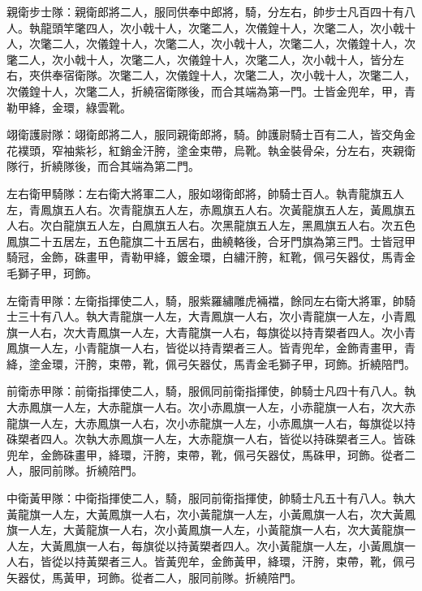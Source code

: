 \begin{pinyinscope}
 親衛步士隊：親衛郎將二人，服同供奉中郎將，騎，分左右，帥步士凡百四十有八人。執龍頭竿氅四人，次小戟十人，次氅二人，次儀鍠十人，次氅二人，次小戟十人，次氅二人，次儀鍠十人，次氅二人，次小戟十人，次氅二人，次儀鍠十人，次氅二人，次小戟十人，次氅二人，次儀鍠十人，次氅二人，次小戟十人，皆分左右，夾供奉宿衛隊。次氅二人，次儀鍠十人，次氅二人，次小戟十人，次氅二人，次儀鍠十人，次氅二人，折繞宿衛隊後，而合其端為第一門。士皆金兜牟，甲，青勒甲絳，金環，綠雲靴。



 翊衛護尉隊：翊衛郎將二人，服同親衛郎將，騎。帥護尉騎士百有二人，皆交角金花襆頭，窄袖紫衫，紅銷金汗胯，塗金束帶，烏靴。執金裝骨朵，分左右，夾親衛隊行，折繞隊後，而合其端為第二門。



 左右衛甲騎隊：左右衛大將軍二人，服如翊衛郎將，帥騎士百人。執青龍旗五人左，青鳳旗五人右。次青龍旗五人左，赤鳳旗五人右。次黃龍旗五人左，黃鳳旗五人右。次白龍旗五人左，白鳳旗五人右。次黑龍旗五人左，黑鳳旗五人右。次五色鳳旗二十五居左，五色龍旗二十五居右，曲繞輅後，合牙門旗為第三門。士皆冠甲騎冠，金飾，硃畫甲，青勒甲絳，鍍金環，白繡汗胯，紅靴，佩弓矢器仗，馬青金毛獅子甲，珂飾。



 左衛青甲隊：左衛指揮使二人，騎，服紫羅繡雕虎裲襠，餘同左右衛大將軍，帥騎士三十有八人。執大青龍旗一人左，大青鳳旗一人右，次小青龍旗一人左，小青鳳旗一人右，次大青鳳旗一人左，大青龍旗一人右，每旗從以持青槊者四人。次小青鳳旗一人左，小青龍旗一人右，皆從以持青槊者三人。皆青兜牟，金飾青畫甲，青絳，塗金環，汗胯，束帶，靴，佩弓矢器仗，馬青金毛獅子甲，珂飾。折繞陪門。



 前衛赤甲隊：前衛指揮使二人，騎，服佩同前衛指揮使，帥騎士凡四十有八人。執大赤鳳旗一人左，大赤龍旗一人右。次小赤鳳旗一人左，小赤龍旗一人右，次大赤龍旗一人左，大赤鳳旗一人右，次小赤龍旗一人左，小赤鳳旗一人右，每旗從以持硃槊者四人。次執大赤鳳旗一人左，大赤龍旗一人右，皆從以持硃槊者三人。皆硃兜牟，金飾硃畫甲，絳環，汗胯，束帶，靴，佩弓矢器仗，馬硃甲，珂飾。從者二人，服同前隊。折繞陪門。



 中衛黃甲隊：中衛指揮使二人，騎，服同前衛指揮使，帥騎士凡五十有八人。執大黃龍旗一人左，大黃鳳旗一人右，次小黃龍旗一人左，小黃鳳旗一人右，次大黃鳳旗一人左，大黃龍旗一人右，次小黃鳳旗一人左，小黃龍旗一人右，次大黃龍旗一人左，大黃鳳旗一人右，每旗從以持黃槊者四人。次小黃龍旗一人左，小黃鳳旗一人右，皆從以持黃槊者三人。皆黃兜牟，金飾黃甲，絳環，汗胯，束帶，靴，佩弓矢器仗，馬黃甲，珂飾。從者二人，服同前隊。折繞陪門。




\end{pinyinscope}
